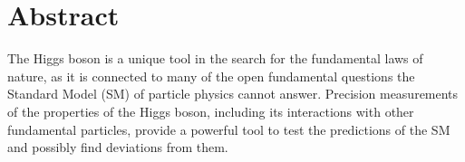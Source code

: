 \chapter*{Abstract}
The Higgs boson is a unique tool in the search for the fundamental laws of nature, as it is connected to many of the open fundamental questions the Standard Model (SM) of particle physics cannot answer.
Precision measurements of the properties of the Higgs boson, including its interactions with other fundamental particles, provide a powerful tool to test the predictions of the SM and possibly find deviations from them.
